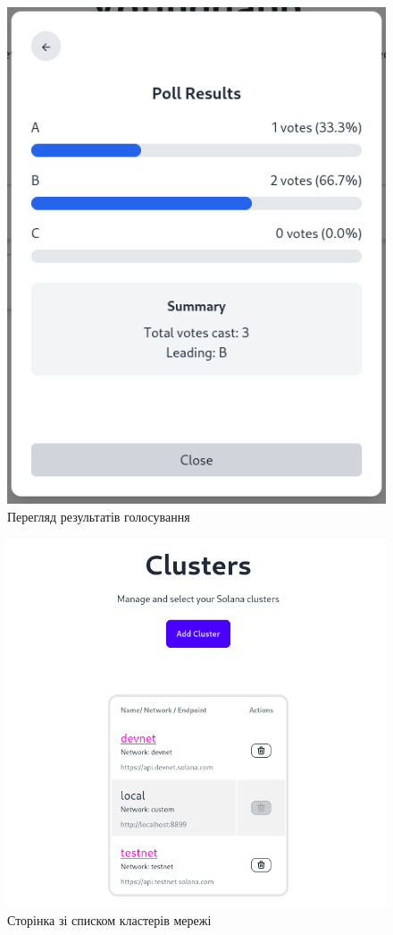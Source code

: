 \documentclass[14pt]{extreport}
\begin{document}
  \begin{figure}[H]
    \centering
    \includegraphics[scale=0.5]{UIResults}
    \caption{Перегляд результатів голосування}
    \label{fig:UIResults}
  \end{figure}
  
  \begin{figure}[H]
    \centering
    \includegraphics[scale=0.5]{UIClusters}
    \caption{Сторінка зі списком кластерів мережі}
    \label{fig:UIClusters}
  \end{figure}
  
\end{document}
